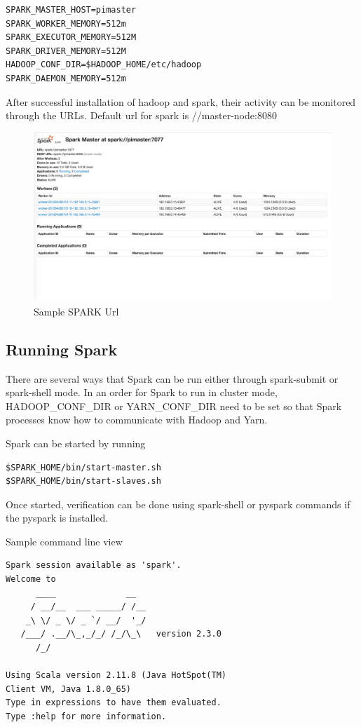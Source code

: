 \begin{verbatim}
SPARK_MASTER_HOST=pimaster
SPARK_WORKER_MEMORY=512m
SPARK_EXECUTOR_MEMORY=512M
SPARK_DRIVER_MEMORY=512M
HADOOP_CONF_DIR=$HADOOP_HOME/etc/hadoop
SPARK_DAEMON_MEMORY=512m
\end{verbatim}

After successful installation of hadoop and spark, their activity can be monitored through the URLs.
Default url for spark is 
//master-node:8080

\begin{figure}[htbp] 
	\centering
	\includegraphics[width=\columnwidth]{images/sparkurl.jpg}
	\caption{Sample SPARK Url}
\label{fig:sparkurl} 
\end{figure}

\subsection{Running Spark}

There are several ways that Spark can be run either through
spark-submit or spark-shell mode. In an order for Spark to run in
cluster mode, HADOOP\_CONF\_DIR or YARN\_CONF\_DIR need to be set so
that Spark processes know how to communicate with Hadoop and Yarn.

Spark can be started by running

\begin{verbatim}
$SPARK_HOME/bin/start-master.sh
$SPARK_HOME/bin/start-slaves.sh
\end{verbatim}

Once started, verification can be done using spark-shell or pyspark
commands if the pyspark is installed.

Sample command line view

\begin{verbatim}
Spark session available as 'spark'.
Welcome to
      ____              __
     / __/__  ___ _____/ /__
    _\ \/ _ \/ _ `/ __/  '_/
   /___/ .__/\_,_/_/ /_/\_\   version 2.3.0
      /_/
         
Using Scala version 2.11.8 (Java HotSpot(TM) 
Client VM, Java 1.8.0_65)
Type in expressions to have them evaluated.
Type :help for more information.
\end{verbatim}

